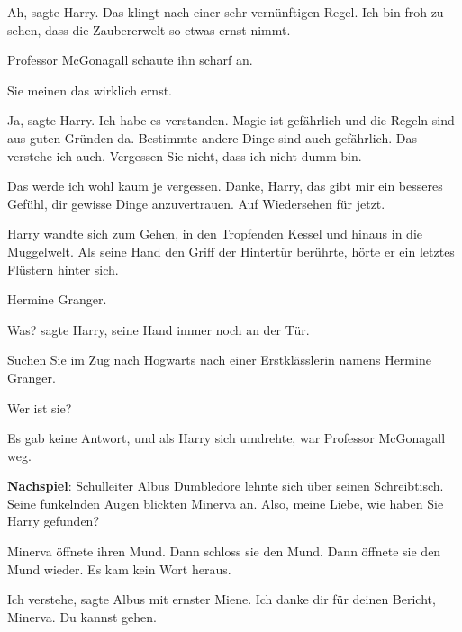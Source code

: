 \glqq Ah\grqq{}, sagte Harry. \glqq Das klingt nach einer sehr vernünftigen
Regel. Ich bin froh zu sehen, dass die Zaubererwelt so etwas ernst nimmt.\grqq{}

Professor McGonagall schaute ihn scharf an.

\glqq Sie meinen das wirklich ernst.\grqq{}

\glqq Ja\grqq{}, sagte Harry. \glqq Ich habe es verstanden. Magie ist gefährlich
und die Regeln sind aus guten Gründen da. Bestimmte andere Dinge sind auch
gefährlich. Das verstehe ich auch. Vergessen Sie nicht, dass ich nicht dumm
bin.\grqq{}

\glqq Das werde ich wohl kaum je vergessen. Danke, Harry, das gibt mir ein
besseres Gefühl, dir gewisse Dinge anzuvertrauen. Auf Wiedersehen für
jetzt.\grqq{}

Harry wandte sich zum Gehen, in den Tropfenden Kessel und hinaus in die
Muggelwelt. Als seine Hand den Griff der Hintertür berührte, hörte er ein
letztes Flüstern hinter sich.

\glqq Hermine Granger.\grqq{}

\glqq Was?\grqq{} sagte Harry, seine Hand immer noch an der Tür.

\glqq Suchen Sie im Zug nach Hogwarts nach einer Erstklässlerin namens Hermine
Granger.\grqq{}

\glqq Wer ist sie?\grqq{}

Es gab keine Antwort, und als Harry sich umdrehte, war Professor McGonagall weg.

\textbf{Nachspiel}: Schulleiter Albus Dumbledore lehnte sich über seinen
Schreibtisch. Seine funkelnden Augen blickten Minerva an. \glqq Also, meine
Liebe, wie haben Sie Harry gefunden?\grqq{}

Minerva öffnete ihren Mund. Dann schloss sie den Mund. Dann öffnete sie den Mund
wieder. Es kam kein Wort heraus.

\glqq Ich verstehe\grqq{}, sagte Albus mit ernster Miene. \glqq Ich danke dir
für deinen Bericht, Minerva. Du kannst gehen.\grqq{}
